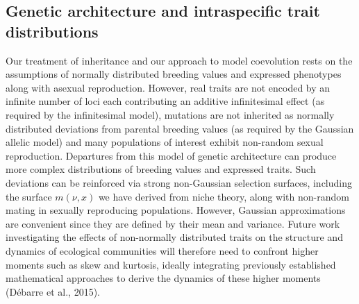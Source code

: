 \documentclass[]{elsarticle} %
\begin{document}
\hypertarget{genetic-architecture-and-intraspecific-trait-distributions}{%
\subsection{Genetic architecture and intraspecific trait
distributions}\label{genetic-architecture-and-intraspecific-trait-distributions}}

Our treatment of inheritance and our approach to model coevolution rests
on the assumptions of normally distributed breeding values and expressed
phenotypes along with asexual reproduction. However, real traits are not
encoded by an infinite number of loci each contributing an additive
infinitesimal effect (as required by the infinitesimal model), mutations
are not inherited as normally distributed deviations from parental
breeding values (as required by the Gaussian allelic model) and many
populations of interest exhibit non-random sexual reproduction.
Departures from this model of genetic architecture can produce more
complex distributions of breeding values and expressed traits. Such
deviations can be reinforced via strong non-Gaussian selection surfaces,
including the surface \(m(\nu,x)\) we have derived from niche theory,
along with non-random mating in sexually reproducing populations.
However, Gaussian approximations are convenient since they are defined
by their mean and variance. Future work investigating the effects of
non-normally distributed traits on the structure and dynamics of
ecological communities will therefore need to confront higher moments
such as skew and kurtosis, ideally integrating previously established
mathematical approaches to derive the dynamics of these higher moments
(Débarre et al., 2015).
\end{document}
